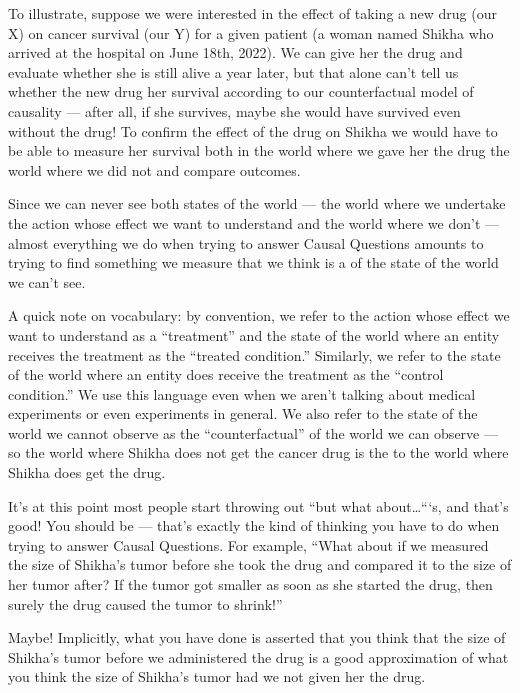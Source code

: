 \documentclass[letterpaper,10pt,english]{jupyterBook}
\begin{document}
\sphinxAtStartPar
To illustrate, suppose we were interested in the effect of taking a new drug (our X) on cancer survival (our Y) for a given patient (a woman named Shikha who arrived at the hospital on June 18th, 2022). We can give her the drug and evaluate whether she is still alive a year later, but that alone can’t tell us whether the new drug  her survival according to our counterfactual model of causality — after all, if she survives, maybe she would have survived even without the drug! To confirm the effect of the drug on Shikha  we would have to be able to measure her survival both in the world where we gave her the drug  the world where we did not and compare outcomes.

\sphinxAtStartPar
Since we can never see both states of the world — the world where we undertake the action whose effect we want to understand and the world where we don’t — almost everything we do when trying to answer Causal Questions amounts to trying to find something we  measure that we think is a  of the state of the world we can’t see.

\sphinxAtStartPar
A quick note on vocabulary: by convention, we refer to the action whose effect we want to understand as a “treatment” and the state of the world where an entity receives the treatment as the “treated condition.” Similarly, we refer to the state of the world where an entity does  receive the treatment as the “control condition.” We use this language even when we aren’t talking about medical experiments or even experiments in general. We also refer to the state of the world we cannot observe as the “counterfactual” of the world we can observe — so the world where Shikha does not get the cancer drug is the  to the world where Shikha does get the drug.

\sphinxAtStartPar
It’s at this point most people start throwing out “but what about…“‘s, and that’s good! You should be — that’s exactly the kind of thinking you have to do when trying to answer Causal Questions. For example, “What about if we measured the size of Shikha’s tumor before she took the drug and compared it to the size of her tumor after? If the tumor got smaller as soon as she started the drug, then surely the drug caused the tumor to shrink!”

\sphinxAtStartPar
Maybe! Implicitly, what you have done is asserted that you think that the size of Shikha’s tumor before we administered the drug is a good approximation of what you think the size of Shikha’s tumor  had we not given her the drug.
\end{document}
